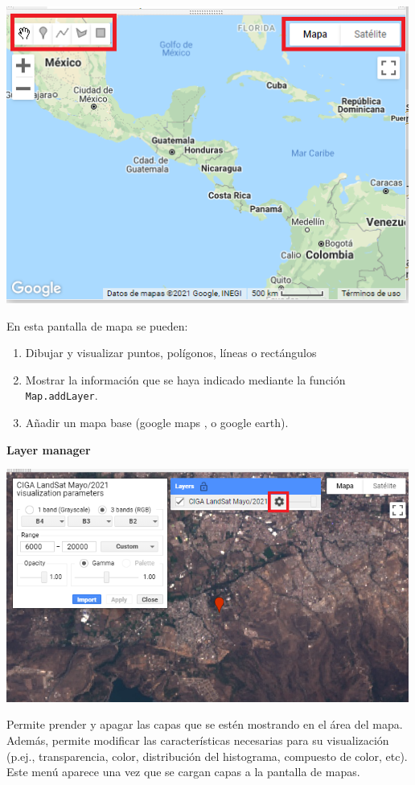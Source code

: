 \documentclass[
]{article}
\providecommand{\tightlist}{%
  \setlength{\itemsep}{0pt}\setlength{\parskip}{0pt}}
\begin{document}
\includegraphics[width=500px]{Img/drawing}

En esta pantalla de mapa se pueden:

\begin{enumerate}
\def\labelenumi{\arabic{enumi}.}
\tightlist
\item
  Dibujar y visualizar puntos, polígonos, líneas o rectángulos
\item
  Mostrar la información que se haya indicado mediante la función
  \texttt{Map.addLayer}.
\item
  Añadir un mapa base (google maps , o google earth).
\end{enumerate}

\textbf{Layer manager}

\includegraphics[width=500px]{Img/layer}

Permite prender y apagar las capas que se estén mostrando en el área del
mapa. Además, permite modificar las características necesarias para su
visualización (p.ej., transparencia, color, distribución del histograma,
compuesto de color, etc). Este menú aparece una vez que se cargan capas
a la pantalla de mapas.
\end{document}
